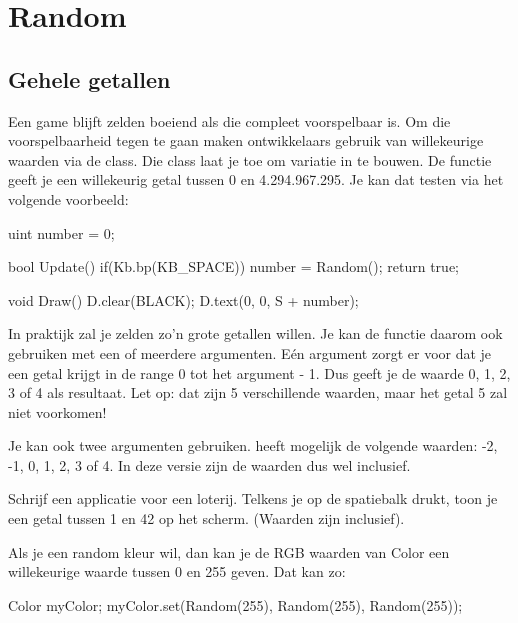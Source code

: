 \chapter{Random}

\section{Gehele getallen}
Een game blijft zelden boeiend als die compleet voorspelbaar is. Om die voorspelbaarheid tegen te gaan maken ontwikkelaars gebruik van willekeurige waarden via de  class. Die class laat je toe om variatie in te bouwen. De functie  geeft je een willekeurig getal tussen 0 en 4.294.967.295. Je kan dat testen via het volgende voorbeeld:

\begin{code}
uint number = 0;

bool Update() {
  if(Kb.bp(KB_SPACE)) number = Random();
	return true;
}

void Draw() {
	D.clear(BLACK);
	D.text(0, 0, S + number);
}
\end{code}

In praktijk zal je zelden zo'n grote getallen willen. Je kan de functie  daarom ook gebruiken met een of meerdere argumenten. E\'en argument zorgt er voor dat je een getal krijgt in de range 0 tot het argument - 1. Dus  geeft je de waarde 0, 1, 2, 3 of 4 als resultaat. Let op: dat zijn 5 verschillende waarden, maar het getal 5 zal niet voorkomen!

Je kan ook twee argumenten gebruiken.  heeft mogelijk de volgende waarden: -2, -1, 0, 1, 2, 3 of 4. In deze versie zijn de waarden dus wel inclusief.

\begin{exercise}
Schrijf een applicatie voor een loterij. Telkens je op de spatiebalk drukt, toon je een getal tussen 1 en 42 op het scherm. (Waarden zijn inclusief).
\end{exercise}

\begin{note}
Als je een random kleur wil, dan kan je de RGB waarden van Color een willekeurige waarde tussen 0 en 255 geven. Dat kan zo:

\begin{code}
Color myColor;
myColor.set(Random(255), Random(255), Random(255));
\end{code}
\end{note}

